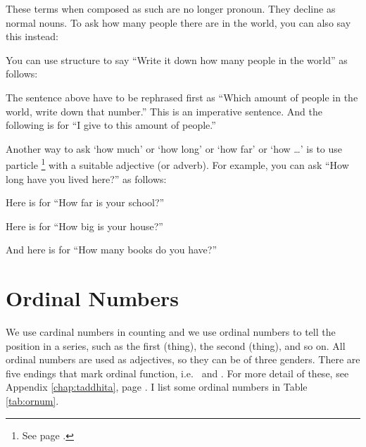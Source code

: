 These terms when composed as such are no longer pronoun. They decline as normal nouns. To ask how many people there are in the world, you can also say this instead:


You can use  structure to say ``Write it down how many people in the world'' as follows:


The sentence above have to be rephrased first as ``Which amount of people in the world, write down that number.'' This is an imperative sentence. And the following is for ``I give to this amount of people.''


Another way to ask `how much' or `how long' or `how far' or `how \ldots' is to use particle \footnote{See page \pageref{nip:kiiva}.} with a suitable adjective (or adverb). For example, you can ask ``How long have you lived here?'' as follows:


Here is for ``How far is your school?''


Here is for ``How big is your house?''


And here is for ``How many books do you have?''


\clearpage
{}
{}
\section*{Ordinal Numbers}

We use cardinal numbers in counting and we use ordinal numbers to tell the position in a series, such as the first (thing), the second (thing), and so on. All ordinal numbers are used as adjectives, so they can be of three genders. There are five endings that mark ordinal function, i.e.\  and . For more detail of these, see Appendix \ref{chap:taddhita}, page \pageref{par:sankhyataddhita}. I list some ordinal numbers in Table \ref{tab:ornum}.

